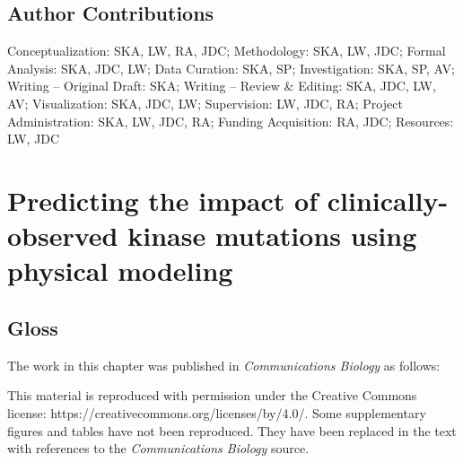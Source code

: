 \documentclass[phd,tocprelim]{cornell}
\begin{document}

\section{Author Contributions}
Conceptualization: SKA, LW, RA, JDC; Methodology: SKA, LW, JDC; Formal Analysis: SKA, JDC, LW; Data Curation: SKA, SP; Investigation: SKA, SP, AV; Writing -- Original Draft: SKA; Writing -- Review \& Editing: SKA, JDC, LW, AV; Visualization: SKA, JDC, LW; Supervision: LW, JDC, RA; Project Administration: SKA, LW, JDC, RA; Funding Acquisition: RA, JDC; Resources: LW, JDC


\chapter{Predicting the impact of clinically-observed kinase mutations using physical modeling}

\section{Gloss}

The work in this chapter was published in \emph{Communications Biology} as follows: 
\realsinglespacing
{}
\realdoublespacing

This material is reproduced with permission under the Creative Commons license: https://creativecommons.org/licenses/by/4.0/. Some supplementary figures and tables have not been reproduced. They have been replaced in the text with references to the \emph{Communications Biology} source. 
 
\end{document}
